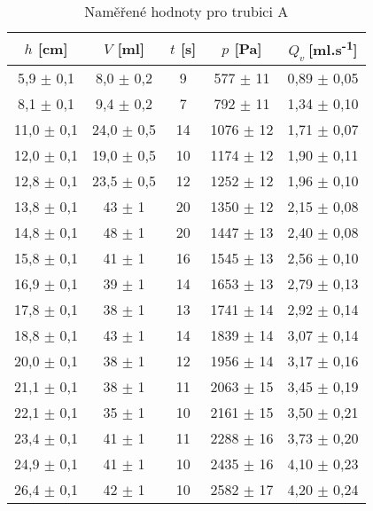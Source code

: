 \begin{table}[htbp]
\centering
\begin{tabular}{|ccccc|}
\hline
$h$ [cm] & $V$ [ml] & $t$ [s] & $p$ [Pa] & $Q_v~$[ml.s\textsuperscript{-1}] \\ \hline
5,9 $\pm$ 0,1 & 8,0 $\pm$ 0,2 & 9 & 577 $\pm$ 11 & 0,89 $\pm$ 0,05\\ 
8,1 $\pm$ 0,1 & 9,4 $\pm$ 0,2 & 7 & 792 $\pm$ 11 & 1,34 $\pm$ 0,10 \\ 
11,0 $\pm$ 0,1 & 24,0 $\pm$ 0,5 & 14 & 1076 $\pm$ 12 & 1,71 $\pm$ 0,07 \\ 
12,0 $\pm$ 0,1 & 19,0 $\pm$ 0,5 & 10 & 1174 $\pm$ 12 & 1,90 $\pm$ 0,11 \\ 
12,8 $\pm$ 0,1 & 23,5 $\pm$ 0,5 & 12 & 1252 $\pm$ 12 & 1,96 $\pm$ 0,10 \\ 
13,8 $\pm$ 0,1 & 43 $\pm$ 1 & 20 & 1350 $\pm$ 12 & 2,15 $\pm$ 0,08 \\ 
14,8 $\pm$ 0,1 & 48 $\pm$ 1 & 20 & 1447 $\pm$ 13 & 2,40 $\pm$ 0,08 \\ 
15,8 $\pm$ 0,1 & 41 $\pm$ 1 & 16 & 1545 $\pm$ 13 & 2,56 $\pm$ 0,10 \\ 
16,9 $\pm$ 0,1 & 39 $\pm$ 1 & 14 & 1653 $\pm$ 13 & 2,79 $\pm$ 0,13 \\ 
17,8 $\pm$ 0,1 & 38 $\pm$ 1 & 13 & 1741 $\pm$ 14 & 2,92 $\pm$ 0,14 \\ 
18,8 $\pm$ 0,1 & 43 $\pm$ 1 & 14 & 1839 $\pm$ 14 & 3,07 $\pm$ 0,14 \\ 
20,0 $\pm$ 0,1 & 38 $\pm$ 1 & 12 & 1956 $\pm$ 14 & 3,17 $\pm$ 0,16 \\ 
21,1 $\pm$ 0,1 & 38 $\pm$ 1 & 11 & 2063 $\pm$ 15 & 3,45 $\pm$ 0,19 \\ 
22,1 $\pm$ 0,1 & 35 $\pm$ 1 & 10 & 2161 $\pm$ 15 & 3,50 $\pm$ 0,21 \\ 
23,4 $\pm$ 0,1 & 41 $\pm$ 1 & 11 & 2288 $\pm$ 16 & 3,73 $\pm$ 0,20 \\ 
24,9 $\pm$ 0,1 & 41 $\pm$ 1 & 10 & 2435 $\pm$ 16 & 4,10 $\pm$ 0,23 \\ 
26,4 $\pm$ 0,1 & 42 $\pm$ 1 & 10 & 2582 $\pm$ 17 & 4,20 $\pm$ 0,24 \\ \hline
\end{tabular}
\caption{Naměřené hodnoty pro trubici A}
\label{tab:vysledkyA}
\end{table}


